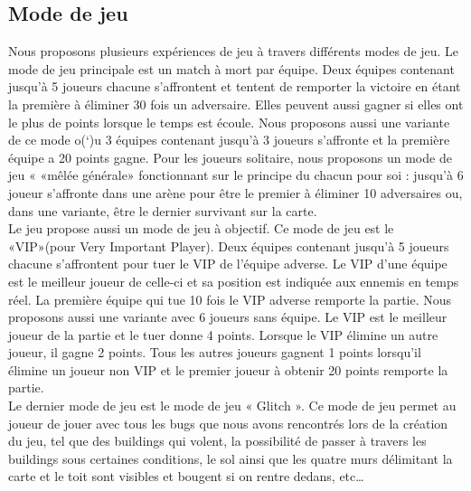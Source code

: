 \documentclass[12pt, titlepage]{article}
\begin{document}
\begin{spacing}{1.5}
\subsection{Mode de jeu}

Nous proposons plusieurs expériences de jeu à travers différents modes de jeu. Le mode de jeu principale est un match à mort par équipe. Deux équipes contenant jusqu'à 5 joueurs chacune s'affrontent et tentent de remporter la victoire en étant la première à éliminer 30 fois un adversaire. Elles peuvent aussi gagner si elles ont le plus de points lorsque le temps est écoule. Nous proposons aussi une variante de ce mode o(‘)u 3 équipes contenant jusqu'à 3 joueurs s'affronte et la première équipe a 20 points gagne. Pour les joueurs solitaire, nous proposons un mode de jeu « «mêlée générale» fonctionnant sur le principe du chacun pour soi : jusqu'à 6 joueur s'affronte dans une arène pour être le premier à éliminer 10 adversaires ou, dans une variante, être le dernier survivant sur la carte. \\

Le jeu propose aussi un mode de jeu à objectif. Ce mode de jeu est le «VIP»(pour Very Important Player). Deux équipes contenant jusqu'à 5 joueurs chacune s'affrontent pour tuer le VIP de l'équipe adverse. Le VIP d'une équipe est le meilleur joueur de celle-ci et sa position est indiquée aux ennemis en temps réel. La première équipe qui tue 10 fois le VIP adverse remporte la partie. Nous proposons aussi une variante avec 6 joueurs sans équipe. Le VIP est le meilleur joueur de la partie et le tuer donne 4 points. Lorsque le VIP élimine un autre joueur, il gagne 2 points. Tous les autres joueurs gagnent 1 points lorsqu'il élimine un joueur non VIP et le premier joueur à obtenir 20 points remporte la partie. \\

Le dernier mode de jeu est le mode de jeu « Glitch ». Ce mode de jeu permet au joueur de jouer avec tous les bugs que nous avons rencontrés lors de la création du jeu, tel que des buildings qui volent, la possibilité de passer à travers les buildings sous certaines conditions, le sol ainsi que les quatre murs délimitant la carte et le toit sont visibles et bougent si on rentre dedans, etc… \\


\end{spacing}
\end{document}
